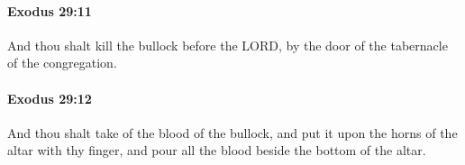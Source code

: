 		\paragraph{Exodus 29:11} %
			\label{EXODUS-29-11}

			And thou shalt kill the bullock before the LORD, by the door of the tabernacle of the congregation.


		\paragraph{Exodus 29:12} %
			\label{EXODUS-29-12}

			And thou shalt take of the blood of the bullock, and put it upon the horns of the altar with thy finger, and pour all the blood beside the bottom of the altar.


